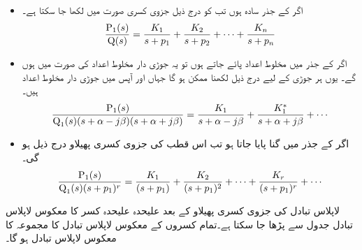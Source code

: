 \begin{itemize}
\item
اگر  کے جذر سادہ ہوں تب  کو درج ذیل جزوی کسری صورت میں لکھا جا سکتا ہے۔
\begin{align}
\frac{{{\textup{P}}}_1(s)}{{{\textup{Q}}}(s)}=\frac{K_1}{s+p_1}+\frac{K_2}{s+p_2}+\cdots+\frac{K_n}{s+p_n}
\end{align}
\item
اگر  کے جذر میں مخلوط اعداد پائے جاتے ہوں تو یہ جوڑی دار مخلوط اعداد کی صورت میں ہوں گے۔ یوں ہر جوڑی کے لیے درج ذیل لکھنا ممکن ہو گا جہاں  اور  آپس میں جوڑی دار مخلوط اعداد ہیں۔
\begin{align}
\frac{{{\textup{P}}}_1(s)}{{{\textup{Q}}}_1(s) (s+\alpha-j\beta)(s+\alpha+j\beta)}=\frac{K_1}{s+\alpha-j\beta}+\frac{K^*_1}{s+\alpha+j\beta}+\cdots
\end{align}
\item
اگر  کے جذر میں   گنا پایا جاتا ہو تب اس قطب کی جزوی کسری پھیلاو درج ذیل ہو گی۔
  \begin{align}
\frac{{{\textup{P}}}_1(s)}{{{\textup{Q}}}_1(s) (s+p_1)^r}=\frac{K_{1}}{(s+p_1)}+\frac{K_{2}}{(s+p_1)^2}+\cdots +\frac{K_{r}}{(s+p_1)^r}+\cdots
\end{align}
\end{itemize}

لاپلاس تبادل  کی جزوی کسری پھیلاو کے بعد علیحدہ علیحدہ کسر کا معکوس لاپلاس تبادل جدول سے پڑھا جا سکتا ہے۔تمام کسروں کے معکوس لاپلاس تبادل کا مجموعہ  کا معکوس لاپلاس تبادل ہو گا۔

